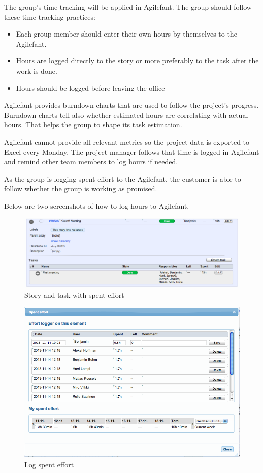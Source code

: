 The group's time tracking will be applied in Agilefant. The group should follow 
these time tracking practices:
\begin{itemize}
\item Each group member should enter their own hours by themselves to the 
Agilefant.
\item Hours are logged directly to the story or more preferably to the task 
after the work is done. 
\item Hours should be logged before leaving the office
\end{itemize}

Agilefant provides burndown charts that are used to follow the project's
progress. Burndown charts tell also whether estimated hours are correlating with
actual hours. That helps the group to shape its task estimation.

Agilefant cannot provide all relevant metrics so the project data is exported to
Excel every Monday. The project manager follows that time is logged in
Agilefant and remind other team members to log hours if needed.

As the group is logging spent effort to the Agilefant, the customer is able to
follow whether the group is working as promised.

Below are two screenshots of how to log hours to Agilefant.

\begin{figure}[H]
\centering
\includegraphics[width=1\textwidth]{imgs/spenteffort1.png}
\caption{Story and task with spent effort}
\label{fig:spenteffort1}
\end{figure}


\begin{figure}[H]
\centering
\includegraphics[width=1\textwidth]{imgs/spenteffort2.png}
\caption{Log spent effort}
\label{fig:spenteffort2}
\end{figure}

